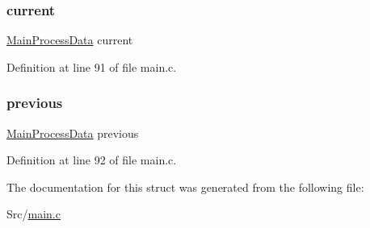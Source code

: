 \subsubsection{\texorpdfstring{current}{current}}
{\footnotesize\ttfamily \mbox{\hyperlink{main_8c_a10c0332e7cd68abe97ec61fa4ac93383}{Main\+Process\+Data}} current}



Definition at line 91 of file main.\+c.

\mbox{\label{struct_app_data___a57a5b5fd3e09c0d8651bffc358acd3c4}} 
\subsubsection{\texorpdfstring{previous}{previous}}
{\footnotesize\ttfamily \mbox{\hyperlink{main_8c_a10c0332e7cd68abe97ec61fa4ac93383}{Main\+Process\+Data}} previous}



Definition at line 92 of file main.\+c.



The documentation for this struct was generated from the following file\+:\begin{DoxyCompactItemize}
\item 
Src/\mbox{\hyperlink{main_8c}{main.\+c}}\end{DoxyCompactItemize}
